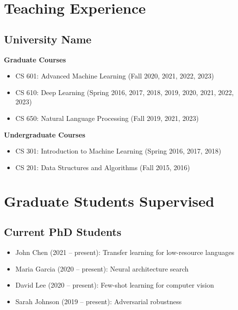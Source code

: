 \documentclass[11pt,letterpaper]{article}
\begin{document}
\section{Teaching Experience}

\subsection{University Name}

\textbf{Graduate Courses}
\begin{itemize}[leftmargin=*]
  \item CS 601: Advanced Machine Learning (Fall 2020, 2021, 2022, 2023)
  \item CS 610: Deep Learning (Spring 2016, 2017, 2018, 2019, 2020, 2021, 2022, 2023)
  \item CS 650: Natural Language Processing (Fall 2019, 2021, 2023)
\end{itemize}

\textbf{Undergraduate Courses}
\begin{itemize}[leftmargin=*]
  \item CS 301: Introduction to Machine Learning (Spring 2016, 2017, 2018)
  \item CS 201: Data Structures and Algorithms (Fall 2015, 2016)
\end{itemize}

\section{Graduate Students Supervised}

\subsection{Current PhD Students}
\begin{itemize}[leftmargin=*]
  \item John Chen (2021 -- present): Transfer learning for low-resource languages
  \item Maria Garcia (2020 -- present): Neural architecture search
  \item David Lee (2020 -- present): Few-shot learning for computer vision
  \item Sarah Johnson (2019 -- present): Adversarial robustness
\end{itemize}
\end{document}
